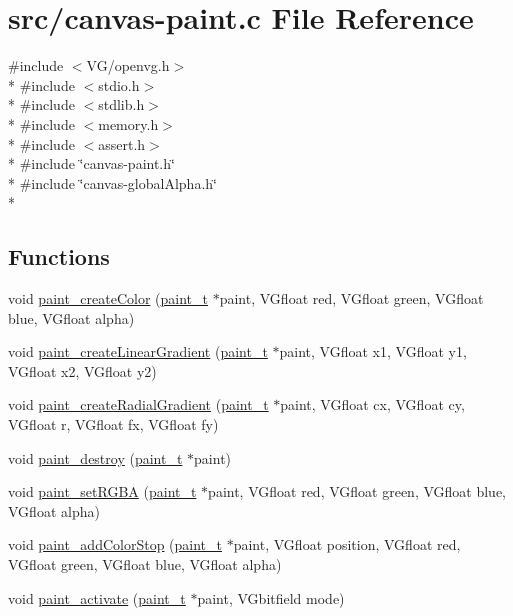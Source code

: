 \hypertarget{canvas-paint_8c}{}\section{src/canvas-\/paint.c File Reference}
\label{canvas-paint_8c}
{\ttfamily \#include $<$V\+G/openvg.\+h$>$}\\*
{\ttfamily \#include $<$stdio.\+h$>$}\\*
{\ttfamily \#include $<$stdlib.\+h$>$}\\*
{\ttfamily \#include $<$memory.\+h$>$}\\*
{\ttfamily \#include $<$assert.\+h$>$}\\*
{\ttfamily \#include \char`\"{}canvas-\/paint.\+h\char`\"{}}\\*
{\ttfamily \#include \char`\"{}canvas-\/global\+Alpha.\+h\char`\"{}}\\*
\subsection*{Functions}
\begin{DoxyCompactItemize}
\item 
void \hyperlink{canvas-paint_8c_ab592ca67fb1837cd3cf544f609b79f64}{paint\+\_\+create\+Color} (\hyperlink{structpaint__t}{paint\+\_\+t} $\ast$paint, V\+Gfloat red, V\+Gfloat green, V\+Gfloat blue, V\+Gfloat alpha)
\item 
void \hyperlink{canvas-paint_8c_ac1598eac12f6ba5d101b2dd09c994600}{paint\+\_\+create\+Linear\+Gradient} (\hyperlink{structpaint__t}{paint\+\_\+t} $\ast$paint, V\+Gfloat x1, V\+Gfloat y1, V\+Gfloat x2, V\+Gfloat y2)
\item 
void \hyperlink{canvas-paint_8c_a79de025c3c5f989806af6ce599084d54}{paint\+\_\+create\+Radial\+Gradient} (\hyperlink{structpaint__t}{paint\+\_\+t} $\ast$paint, V\+Gfloat cx, V\+Gfloat cy, V\+Gfloat r, V\+Gfloat fx, V\+Gfloat fy)
\item 
void \hyperlink{canvas-paint_8c_a430811e2f660a0783c6bf5eff8534b52}{paint\+\_\+destroy} (\hyperlink{structpaint__t}{paint\+\_\+t} $\ast$paint)
\item 
void \hyperlink{canvas-paint_8c_a2b7ce5138c8bd3795c8f6a6adaeb4809}{paint\+\_\+set\+R\+G\+B\+A} (\hyperlink{structpaint__t}{paint\+\_\+t} $\ast$paint, V\+Gfloat red, V\+Gfloat green, V\+Gfloat blue, V\+Gfloat alpha)
\item 
void \hyperlink{canvas-paint_8c_a7b698b25e156840ec595ce6e09eba713}{paint\+\_\+add\+Color\+Stop} (\hyperlink{structpaint__t}{paint\+\_\+t} $\ast$paint, V\+Gfloat position, V\+Gfloat red, V\+Gfloat green, V\+Gfloat blue, V\+Gfloat alpha)
\item 
void \hyperlink{canvas-paint_8c_a1743eb90369368d6504e9a7a15a8cd93}{paint\+\_\+activate} (\hyperlink{structpaint__t}{paint\+\_\+t} $\ast$paint, V\+Gbitfield mode)
\end{DoxyCompactItemize}


